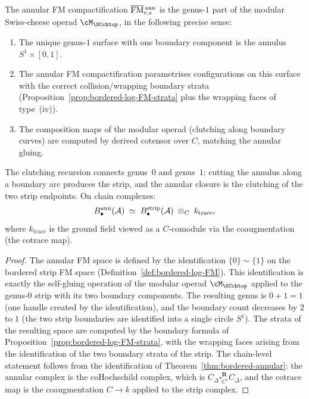 \begin{theorem}
\label{thm:bordered-annular-modular}
The annular FM compactification
$\overline{\mathrm{FM}}{}^{\,\mathrm{ann}}_{r,s}$ is the genus-$1$ part
of the modular Swiss-cheese operad $\cM_{\SCchtop}$, in the
following precise sense:
\begin{enumerate}[label=\textup{(\roman*)}]
\item The unique genus-$1$ surface with one boundary component
is the annulus $S^1 \times [0,1]$.
\item The annular FM compactification parametrises configurations
on this surface with the correct collision/wrapping boundary
strata (Proposition~\ref{prop:bordered-log-FM-strata} plus
the wrapping faces of type~(iv)).
\item The composition maps of the modular operad (clutching along
boundary curves) are computed by derived cotensor over $C$,
matching the annular gluing.
\end{enumerate}

The clutching recursion connects genus~$0$ and genus~$1$: cutting
the annulus along a boundary arc produces the strip, and the
annular closure is the clutching of the two strip endpoints.
On chain complexes:
\[
B^{\mathrm{ann}}_\bullet(\mathcal{A})
\;\simeq\;
B^{\mathrm{strip}}_\bullet(\mathcal{A})\;\otimes_{C}\;k_{\mathrm{trace}},
\]
where $k_{\mathrm{trace}}$ is the ground field viewed as a
$C$-comodule via the coaugmentation (the cotrace map).
\end{theorem}

\begin{proof}
The annular FM space is defined by the identification
$\{0\} \sim \{1\}$ on the bordered strip FM space
(Definition~\ref{def:bordered-log-FM}). This identification
is exactly the self-gluing operation of the modular operad
$\cM_{\SCchtop}$ applied to the genus-$0$ strip with its two
boundary components. The resulting genus is $0 + 1 = 1$
(one handle created by the identification), and the boundary
count decreases by $2$ to $1$ (the two strip boundaries are
identified into a single circle $S^1$). The strata of the
resulting space are computed by the boundary formula of
Proposition~\ref{prop:bordered-log-FM-strata}, with the
wrapping faces arising from the identification of the two
boundary strata of the strip. The chain-level statement follows
from the identification of Theorem~\ref{thm:bordered-annular}:
the annular complex is the coHochschild complex, which is
$C_\Delta \square_{C^e}^{\mathbf R} C_\Delta$, and the
cotrace map is the coaugmentation $C \to k$ applied to
the strip complex.
\end{proof}

